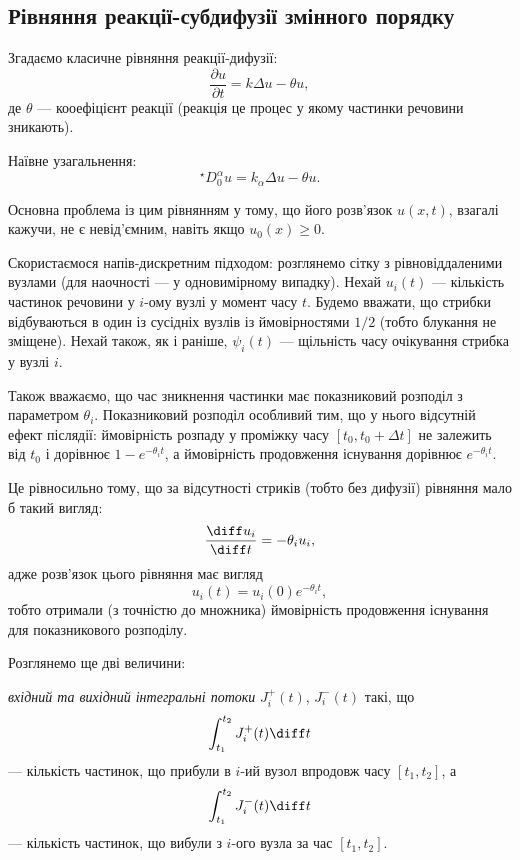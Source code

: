 \subsection{Рівняння реакції-субдифузії змінного порядку}

Згадаємо класичне рівняння реакції-дифузії:
\begin{equation}
    \frac{\partial u}{\partial t} = k \Delta u - \theta u,
\end{equation}
де $\theta$ --- кооефіцієнт реакції (реакція це процес у якому частинки речовини зникають). \medskip

Наївне узагальнення:
\begin{equation}
    {}^\star D_0^\alpha u = k_\alpha \Delta u - \theta u.
\end{equation}

\begin{remark}
    Основна проблема із цим рівнянням у тому, що його розв'язок $u(x, t)$, взагалі кажучи, не є невід'ємним, навіть якщо $u_0(x) \ge 0$.
\end{remark}

Скористаємося напів-дискретним підходом: розглянемо сітку з рівновіддаленими вузлами (для наочності --- у одновимірному випадку). Нехай $u_i(t)$ --- кількість частинок речовини у $i$-ому вузлі у момент часу $t$. Будемо вважати, що стрибки відбуваються в один із сусідніх вузлів із ймовірностями $1/2$ (тобто блукання не зміщене). Нехай також, як і раніше, $\psi_i(t)$ --- щільність часу очікування стрибка у вузлі $i$. \medskip

Також вважаємо, що час зникнення частинки має показниковий розподіл з параметром $\theta_i$. Показниковий розподіл особливий тим, що у нього відсутній ефект післядії: ймовірність розпаду у проміжку часу $[t_0, t_0 + \Delta t]$ не залежить від $t_0$ і дорівнює $1 - e^{-\theta_i t}$, а ймовірність продовження існування дорівнює $e^{-\theta_i t}$. \medskip

Це рівносильно тому, що за відсутності стриків (тобто без дифузії) рівняння мало б такий вигляд:
\begin{equation}
    \frac{\diff u_i}{\diff t} = -\theta_i u_i,
\end{equation}
адже розв'язок цього рівняння має вигляд
\begin{equation}
    u_i(t) = u_i(0) e^{-\theta_i t},
\end{equation}
тобто отримали (з точністю до множника) ймовірність продовження існування для показникового розподілу. \medskip

Розглянемо ще дві величини: 
\begin{definition}
    \textit{вхідний та вихідний інтегральні потоки} $J_i^+(t)$, $J_i^-(t)$ такі, що
    \begin{equation}
        \int_{t_1}^{t_2} J_i^+(t) \diff t
    \end{equation}
    --- кількість частинок, що прибули в $i$-ий вузол впродовж часу $[t_1, t_2]$, а
    \begin{equation}
        \int_{t_1}^{t_2} J_i^-(t) \diff t
    \end{equation}
    --- кількість частинок, що вибули з $i$-ого вузла за час $[t_1, t_2]$.
\end{definition}

